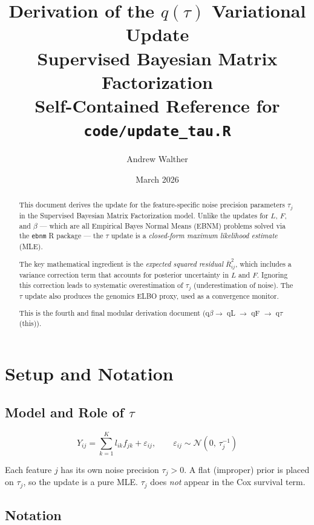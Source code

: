 \documentclass[11pt]{article}
\title{\textbf{Derivation of the $q(\tau)$ Variational Update}\\[4pt]
       \large Supervised Bayesian Matrix Factorization\\[4pt]
       \normalsize Self-Contained Reference for \texttt{code/update\_tau.R}}
\author{Andrew Walther}
\date{March 2026}
\begin{document}
\maketitle

\begin{abstract}
This document derives the update for the feature-specific noise precision
parameters $\tau_j$ in the Supervised Bayesian Matrix Factorization model.
Unlike the updates for $L$, $F$, and $\beta$ — which are all Empirical Bayes
Normal Means (EBNM) problems solved via the \texttt{ebnm} R package — the
$\tau$ update is a \emph{closed-form maximum likelihood estimate} (MLE).

The key mathematical ingredient is the \emph{expected squared residual}
$\bar{R}^2_{ij}$, which includes a variance correction term that accounts
for posterior uncertainty in $L$ and $F$.  Ignoring this correction leads to
systematic overestimation of $\tau_j$ (underestimation of noise).  The $\tau$
update also produces the genomics ELBO proxy, used as a convergence monitor.

This is the fourth and final modular derivation document
(q$\beta \to$ qL $\to$ qF $\to$ q$\tau$ (this)).
\end{abstract}

\tableofcontents
\newpage

\section{Setup and Notation}\label{sec:setup}

\subsection{Model and Role of $\tau$}

\begin{equation}
  Y_{ij} = \sum_{k=1}^K l_{ik}f_{jk} + \varepsilon_{ij},
  \qquad \varepsilon_{ij} \sim \mathcal{N}(0,\,\tau_j^{-1})
  \label{eq:genomics}
\end{equation}

Each feature $j$ has its own noise precision $\tau_j > 0$.  A flat
(improper) prior is placed on $\tau_j$, so the update is a pure MLE.
$\tau_j$ does \emph{not} appear in the Cox survival term.

\subsection{Notation}
\end{document}
